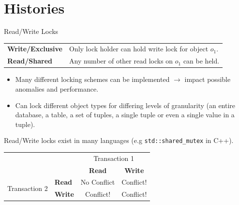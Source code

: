 \section{Histories}
\begin{definitionbox}{Read/Write Locks}
    \begin{center}
        \begin{tabular}{l p{}}
            \textbf{Write/Exclusive} & Only lock holder can hold write lock for object $o_1$. \\
            \textbf{Read/Shared}     & Any number of other read locks on $o_1$ can be held.   \\
        \end{tabular}
    \end{center}
    \begin{itemize}
        \item Many different locking schemes can be implemented $\to$ impact possible anomalies and performance.
        \item Can lock different object types for differing levels of granularity (an entire database, a table, a set of tuples, a single tuple or even a single value in a tuple).
    \end{itemize}
    Read/Write locks exist in many languages (e.g \texttt{std::shared_mutex} in C++).
    \begin{center}
        \begin{tabular}{ r l c c}
                                           &                & \multicolumn{2}{c}{Transaction 1}                  \\
                                           &                & \textbf{Read}                     & \textbf{Write} \\
            \multirow{2}{*}{Transaction 2} & \textbf{Read}  & No Conflict                       & Conflict!      \\
                                           & \textbf{Write} & Conflict!                         & Conflict!      \\
        \end{tabular}
    \end{center}
\end{definitionbox}

